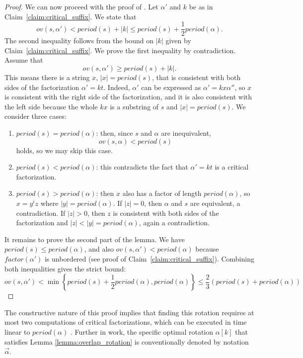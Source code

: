 \begin{proof}
We can now proceed with the proof of . Let
$\alpha'$ and $k$ be as in Claim~\ref{claim:critical_suffix}. We state that
\begin{equation}
ov(s, \alpha') < \textit{period}(s) + |k| \le \textit{period}(s) + \frac{1}{2}\textit{period}(\alpha).
\end{equation}
The second inequality follows from the bound on $|k|$ given by
Claim~\ref{claim:critical_suffix}. We prove the first inequality by
contradiction. Assume that
\begin{equation}
ov(s, \alpha') \geq \textit{period}(s) + |k|.
\end{equation}
This means there is a string $x$, $|x| = \textit{period}(s)$, that is consistent
with both sides of the factorization $\alpha' = kt$. Indeed, $\alpha'$ can be
expressed as $\alpha' = kx\alpha''$, so $x$ is consistent with the right side of
the factorization, and it is also consistent with the left side because the
whole $kx$ is a substring of $s$ and $|x| = \textit{period}(s)$. We consider
three cases:
\begin{enumerate}[label=(\arabic*), leftmargin=*]
\item $\textit{period}(s) = \textit{period}(\alpha)$: then, since $s$ and
$\alpha$ are inequivalent,
\begin{equation}
ov(s, \alpha) < \textit{period}(s)
\end{equation}
holds, so we may skip this case.
\item $\textit{period}(s) < \textit{period}(\alpha)$: this contradicts the fact
that $\alpha' = kt$ is a critical factorization.
\item $\textit{period}(s) > \textit{period}(\alpha)$: then $x$ also has a factor
of length $\textit{period}(\alpha)$, so $x = y^iz$ where $|y| =
\textit{period}(\alpha)$. If $|z| = 0$, then $\alpha$ and $s$ are equivalent, a
contradiction. If $|z| > 0$, then $z$ is consistent with both sides of the
factorization and $|z| < |y| = \textit{period}(\alpha)$, again a contradiction.
\end{enumerate}

It remains to prove the second part of the lemma. We have $\textit{period}(s)
\le \textit{period}(\alpha)$, and also $ov(s, \alpha') <
\textit{period}(\alpha)$ because $\textit{factor}(\alpha')$ is unbordered (see
proof of Claim~\ref{claim:critical_suffix}). Combining both inequalities gives
the strict bound:
\begin{equation}
ov(s, \alpha') < \min\left\{\textit{period}(s) + \frac{1}{2}\textit{period}(\alpha), \textit{period}(\alpha)\right\} \le \frac{2}{3}(\textit{period}(s) + \textit{period}(\alpha))
\end{equation}
\end{proof}
The constructive nature of this proof implies that finding this rotation
requires at most two computations of critical factorizations, which can be
executed in time linear to $\textit{period}(\alpha)$ \cite{crochemore1991two,
crochemore1994text}. Further in work, the specific optimal rotation $\alpha[k]$
that satisfies Lemma \ref{lemma:overlap_rotation} is conventionally denoted by
notation $\vec{\alpha}$.
